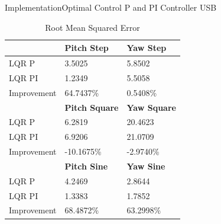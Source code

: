 \documentclass{beamer}
\begin{document}
%
\begin{frame}{Implementation}{Optimal Control P and PI Controller USB}
\begin{table}
    \centering
    \begin{tabular}{l|l|l}
        \toprule
        \textbf{} & \textbf{Pitch Step} & \textbf{Yaw Step}\\
        \toprule
        LQR P & 3.5025 & 5.8502\\
        LQR PI & 1.2349 & 5.5058\\
        Improvement & 64.7437\% & 0.5408\% \\
        \toprule
        \textbf{} & \textbf{Pitch Square} & \textbf{Yaw Square}\\
        \toprule
        LQR P & 6.2819 & 20.4623\\
        LQR PI & 6.9206 & 21.0709\\
        Improvement & -10.1675\% & -2.9740\% \\
        \toprule
        \textbf{} & \textbf{Pitch Sine} & \textbf{Yaw Sine}\\
        \toprule
        LQR P & 4.2469 & 2.8644\\
        LQR PI & 1.3383 & 1.7852\\
        Improvement & 68.4872\% & 63.2998\% \\
    \end{tabular}
    \caption{Root Mean Squared Error}
    \label{tab:RMSE}
\end{table}
\end{frame}
\end{document}
